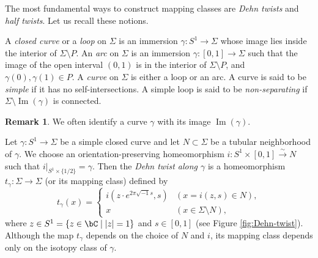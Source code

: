 \documentclass[12pt]{amsart}
\numberwithin{equation}{section}
\theoremstyle{plain}
\theoremstyle{definition}
\newtheorem{remark}[theorem]{Remark}
\DeclareMathOperator{\Image}{\mathrm{Im}}
\begin{document}
The most fundamental ways to construct mapping classes are \emph{Dehn twists} and \emph{half twists}.
Let us recall these notions.

A \emph{closed curve} or a \emph{loop} on $\Sigma$ is an immersion $\gamma \colon S^1 \to \Sigma$ whose image lies inside the interior of $\Sigma \setminus P$.
An \emph{arc} on $\Sigma$ is an immersion $\gamma \colon [0, 1] \to \Sigma$ such that the image of the open interval $(0, 1)$ is in the interior of $\Sigma \setminus P$, and $\gamma(0), \gamma(1) \in P$.
A \emph{curve} on $\Sigma$ is either a loop or an arc.
A curve is said to be \emph{simple} if it has no self-intersections.
A simple loop is said to be \emph{non-separating} if $\Sigma \setminus \Image(\gamma)$ is connected.

\begin{remark}
    We often identify a curve $\gamma$ with its image $\Image(\gamma)$.
\end{remark}


Let $\gamma \colon S^1 \to \Sigma$ be a simple closed curve and let $N \subset \Sigma$ be a tubular neighborhood of $\gamma$.
We choose an orientation-preserving homeomorphism $i \colon S^1 \times [0, 1]\xrightarrow{\sim} N$ such that $i \vert_{S^1 \times \{1/2\} } = \gamma$.
Then the \emph{Dehn twist along $\gamma$} is a homeomorphism $t_\gamma \colon \Sigma \to \Sigma$ (or its mapping class) defined by
\begin{equation}
    t_\gamma(x) =
    \begin{cases}
        i(z \cdot e^{2\pi \sqrt{-1} s}, s) & (x = i(z, s) \in N),        \\
        x                                  & (x \in \Sigma \setminus N),
    \end{cases}
\end{equation}
where $z \in S^1 = \{z \in \bC \mid |z| = 1\}$ and $s \in [0, 1]$ (see Figure \ref{fig:Dehn-twist}).
Although the map $t_\gamma$ depends on the choice of $N$ and $i$, its mapping class depends only on the isotopy class of $\gamma$.
\end{document}
